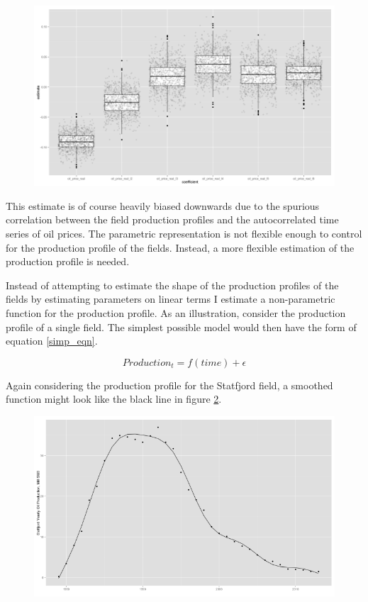 \documentclass[12pt]{article}
\begin{document}
\begin{figure}
\includegraphics[width=1\textwidth]{figures/glm_dirty_box_print.png}
\caption{}
\label{glm_dirty_box_print}
\end{figure}

This estimate is of course heavily biased downwards due to the spurious correlation between the field production profiles and the autocorrelated time series of oil prices.  The parametric representation is not flexible enough to control for the production profile of the fields.  Instead, a more flexible estimation of the production profile is needed. 

Instead of attempting to estimate the shape of the production profiles of the fields by estimating parameters on linear terms I estimate a non-parametric function for the production profile.  As an illustration, consider the production profile of a single field.  The simplest possible model would then have the form of equation \ref{simp_eqn}. 

\begin{equation}
Production_{t}=f(time) + \epsilon
	\label{simp_eqn}
\end{equation}

Again considering the production profile for the Statfjord field, a smoothed function might look like the black line in figure \ref{statfjord_gam}.   

\begin{figure}
	\includegraphics[width=.8\textwidth]{figures/statfjord_gam_print.png}
	\caption{}
	\label{statfjord_gam}
\end{figure}
\end{document}

